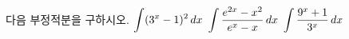 다음 부정적분을 구하시오.
 $\displaystyle\int (3^x-1)^2\mkern3mu dx$
 $\displaystyle\int \dfrac{e^{2x}-x^2}{e^x-x}\mkern3mu dx$
 $\displaystyle\int \dfrac{9^x+1}{3^x}\mkern3mu dx$
